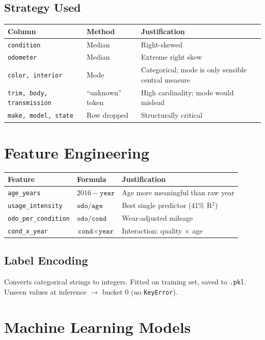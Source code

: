 \documentclass[12pt,a4paper]{article}
\begin{document}
\subsection{Strategy Used}
\begin{longtable}{llp{8cm}}\toprule
  Column & Method & Justification\\\midrule\endhead
  \texttt{condition} & Median & Right-skewed\\
  \texttt{odometer} & Median & Extreme right skew\\
  \texttt{color, interior} & Mode & Categorical; mode is only sensible central measure\\
  \texttt{trim, body, transmission} & ``unknown'' token & High cardinality; mode would mislead\\
  \texttt{make, model, state} & Row dropped & Structurally critical\\\bottomrule
\end{longtable}

\section{Feature Engineering}

\begin{longtable}{lp{4cm}p{7cm}}\toprule
  Feature & Formula & Justification\\\midrule\endhead
  \texttt{age\_years} & $2016-\texttt{year}$ & Age more meaningful than raw year\\
  \texttt{usage\_intensity} & $\texttt{odo}/\texttt{age}$ & Best single predictor (41\% R$^2$)\\
  \texttt{odo\_per\_condition} & $\texttt{odo}/\texttt{cond}$ & Wear-adjusted mileage\\
  \texttt{cond\_x\_year} & $\texttt{cond}\times\texttt{year}$ & Interaction: quality $\times$ age\\\bottomrule
\end{longtable}

\subsection{Label Encoding}
Converts categorical strings to integers. Fitted on training set, saved to \texttt{.pkl}.
Unseen values at inference $\rightarrow$ bucket 0 (no \texttt{KeyError}).

\section{Machine Learning Models}
\end{document}
